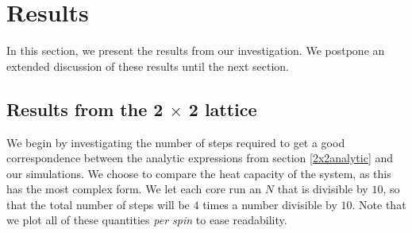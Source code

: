 \documentclass[a4paper, 10pt]{article}
\begin{document}
\section{Results}
In this section, we present the results from our investigation. We postpone an extended discussion of these results until the next section.
\subsection{Results from the 2 $\times$ 2 lattice}
We begin by investigating the number of steps required to get a good correspondence between the analytic expressions from section \ref{2x2analytic} and our simulations. We choose to compare the heat capacity of the system, as this has the most complex form. We let each core run an $N$ that is divisible by $10$, so that the total number of steps will be $4$ times a number divisible by $10$. Note that we plot all of these quantities \textit{per spin} to ease readability.
\end{document}
